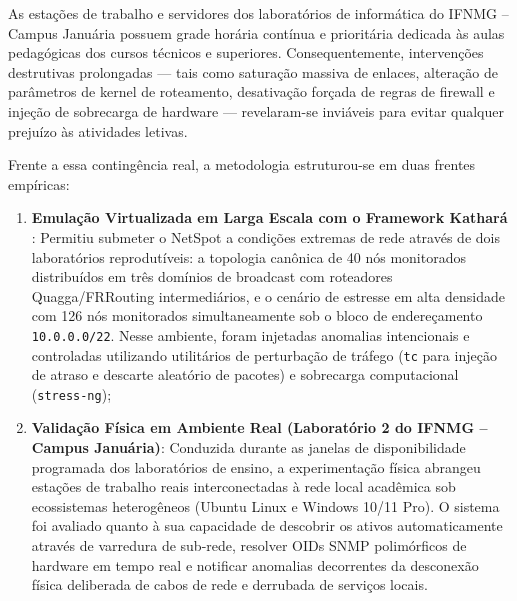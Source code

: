 \documentclass[12pt,a4paper]{article}
\begin{document}
As estações de trabalho e servidores dos laboratórios de informática do IFNMG -- Campus Januária possuem grade horária contínua e prioritária dedicada às aulas pedagógicas dos cursos técnicos e superiores. Consequentemente, intervenções destrutivas prolongadas — tais como saturação massiva de enlaces, alteração de parâmetros de kernel de roteamento, desativação forçada de regras de firewall e injeção de sobrecarga de hardware — revelaram-se inviáveis para evitar qualquer prejuízo às atividades letivas.

Frente a essa contingência real, a metodologia estruturou-se em duas frentes empíricas:
\begin{enumerate}[leftmargin=1.25cm]
\item \textbf{Emulação Virtualizada em Larga Escala com o Framework Kathar{\'a} \cite{bonola2018kathara}}:
Permitiu submeter o NetSpot a condições extremas de rede através de dois laboratórios reprodutíveis: a topologia canônica de 40 nós monitorados distribuídos em três domínios de broadcast com roteadores Quagga/FRRouting intermediários, e o cenário de estresse em alta densidade com 126 nós monitorados simultaneamente sob o bloco de endereçamento \texttt{10.0.0.0/22}. Nesse ambiente, foram injetadas anomalias intencionais e controladas utilizando utilitários de perturbação de tráfego (\texttt{tc} para injeção de atraso e descarte aleatório de pacotes) e sobrecarga computacional (\texttt{stress-ng});
\item \textbf{Validação Física em Ambiente Real (Laboratório 2 do IFNMG -- Campus Januária)}:
Conduzida durante as janelas de disponibilidade programada dos laboratórios de ensino, a experimentação física abrangeu estações de trabalho reais interconectadas à rede local acadêmica sob ecossistemas heterogêneos (Ubuntu Linux e Windows 10/11 Pro). O sistema foi avaliado quanto à sua capacidade de descobrir os ativos automaticamente através de varredura de sub-rede, resolver OIDs SNMP polimórficos de hardware em tempo real e notificar anomalias decorrentes da desconexão física deliberada de cabos de rede e derrubada de serviços locais.
\end{enumerate}
\end{document}
